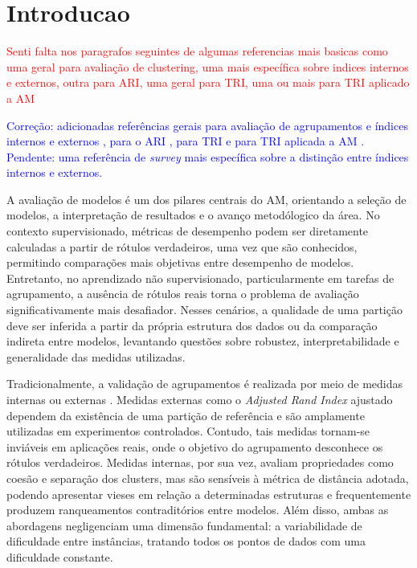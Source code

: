 \chapter{Introducao}
\label{chap:n1_intro}

\textcolor{red}{Senti falta nos paragrafos seguintes de algumas referencias mais basicas como uma geral para avaliação de clustering, uma mais específica sobre indices internos e externos, outra para ARI, uma geral para TRI, uma ou mais para TRI aplicado a AM}

\textcolor{blue}{Correção: adicionadas referências gerais para avaliação de agrupamentos e índices internos e externos \cite{wu2020decision,WOS:000172252500002,WOS:000232704100004,deborah2010survey}, para o ARI \cite{hubert1985comparing}, para TRI \cite{embretson2013item} e para TRI aplicada a AM \cite{chen2019birt, martinez2016making, moraes2020item, moraes2022evaluating}. Pendente: uma referência de \textit{survey} mais específica sobre a distinção entre índices internos e externos.}

A avaliação de modelos é um dos pilares centrais do \gls{AM}, orientando a seleção de modelos, a interpretação de resultados e o avanço metodólogico da área. No contexto supervisionado, métricas de desempenho podem ser diretamente calculadas a partir de rótulos verdadeiros, uma vez que são conhecidos, permitindo comparações mais objetivas entre desempenho de modelos. Entretanto, no aprendizado não supervisionado, particularmente em tarefas de agrupamento, a ausência de rótulos reais torna o problema de avaliação significativamente mais desafiador. Nesses cenários, a qualidade de uma partição deve ser inferida a partir da própria estrutura dos dados ou da comparação indireta entre modelos, levantando questões sobre robustez, interpretabilidade e generalidade das medidas utilizadas.

Tradicionalmente, a validação de agrupamentos é realizada por meio de medidas internas ou externas \cite{wu2020decision,WOS:000172252500002,WOS:000232704100004,deborah2010survey}. Medidas externas como o \textit{Adjusted Rand Index} \cite{hubert1985comparing} ajustado dependem da existência de uma partição de referência e são amplamente utilizadas em experimentos controlados. Contudo, tais medidas tornam-se inviáveis em aplicações reais, onde o objetivo do agrupamento desconhece os rótulos verdadeiros. Medidas internas, por sua vez, avaliam propriedades como coesão e separação dos clusters, mas são sensíveis à métrica de distância adotada, podendo apresentar vieses em relação a determinadas estruturas e frequentemente produzem ranqueamentos contraditórios entre modelos. Além disso, ambas as abordagens negligenciam uma dimensão fundamental: a variabilidade de dificuldade entre instâncias, tratando todos os pontos de dados com uma dificuldade constante.

